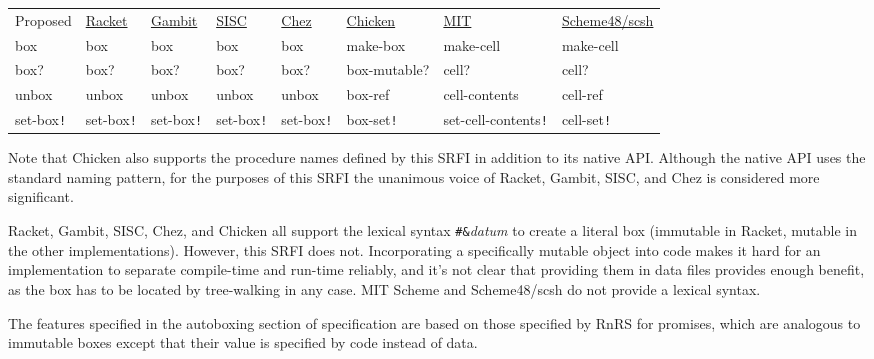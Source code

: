 \begin{longtable}[]{@{}llllllll@{}}
\toprule
Proposed &
\href{http://docs.racket-lang.org/reference/boxes.html}{Racket} &
\href{http://www.iro.umontreal.ca/~gambit/doc/gambit-c.html\#index-boxes}{Gambit}
& \href{http://sisc-scheme.org/manual/html/ch03.html\#Boxing}{SISC} &
\href{http://www.scheme.com/csug7/objects.html\#g50}{Chez} &
\href{http://wiki.call-cc.org/eggref/4/box}{Chicken} &
\href{http://web.mit.edu/scheme_v9.0.1/doc/mit-scheme-ref/Cells.html}{MIT}
&
\href{http://s48.org/1.1/manual/s48manual_42.html}{Scheme48/scsh}\tabularnewline
box & box & box & box & box & make-box & make-cell &
make-cell\tabularnewline
box? & box? & box? & box? & box? & box-mutable? & cell? &
cell?\tabularnewline
unbox & unbox & unbox & unbox & unbox & box-ref & cell-contents &
cell-ref\tabularnewline
set-box\texttt{!} & set-box\texttt{!} & set-box\texttt{!} &
set-box\texttt{!} & set-box\texttt{!} & box-set\texttt{!} &
set-cell-contents\texttt{!} & cell-set\texttt{!}\tabularnewline
\bottomrule
\end{longtable}

Note that Chicken also supports the procedure names defined by this SRFI
in addition to its native API. Although the native API uses the standard
naming pattern, for the purposes of this SRFI the unanimous voice of
Racket, Gambit, SISC, and Chez is considered more significant.

Racket, Gambit, SISC, Chez, and Chicken all support the lexical syntax
\texttt{\#\&}\emph{datum} to create a literal box (immutable in Racket,
mutable in the other implementations). However, this SRFI does not.
Incorporating a specifically mutable object into code makes it hard for
an implementation to separate compile-time and run-time reliably, and
it's not clear that providing them in data files provides enough
benefit, as the box has to be located by tree-walking in any case. MIT
Scheme and Scheme48/scsh do not provide a lexical syntax.

The features specified in the autoboxing section of specification are
based on those specified by RnRS for promises, which are analogous to
immutable boxes except that their value is specified by code instead of
data.

